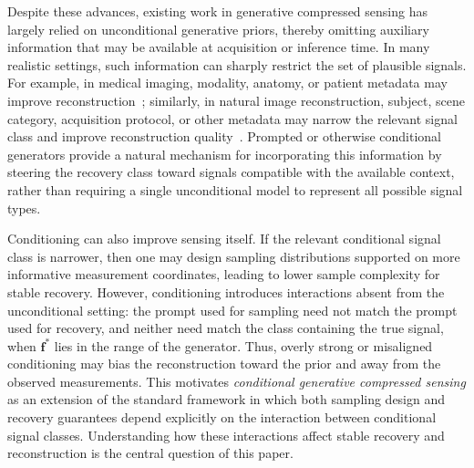 \documentclass{article}
\theoremstyle{plain}
\theoremstyle{definition}
\theoremstyle{remark}
\begin{document}
Despite these advances, existing work in generative compressed sensing has largely relied on unconditional generative priors, thereby omitting auxiliary information that may be available at acquisition or inference time. In many realistic settings, such information can sharply restrict the set of plausible signals. For example, in medical imaging, modality, anatomy, or patient metadata may improve reconstruction~\cite{chung2025contextmri}; similarly, in natural image reconstruction, subject, scene category, acquisition protocol, or other metadata may narrow the relevant signal class and improve reconstruction quality~\cite{chung2024prompttune, kim2025regularization}. Prompted or otherwise conditional generators provide a natural mechanism for incorporating this information by steering the recovery class toward signals compatible with the available context, rather than requiring a single unconditional model to represent all possible signal types.

Conditioning can also improve sensing itself. If the relevant conditional signal class is narrower, then one may design sampling distributions supported on more informative measurement coordinates, leading to lower sample complexity for stable recovery. However, conditioning introduces interactions absent from the unconditional setting: the prompt used for sampling need not match the prompt used for recovery, and neither need match the class containing the true signal, when $\mathbf f^*$ lies in the range of the generator. Thus, overly strong or misaligned conditioning may bias the reconstruction toward the prior and away from the observed measurements. This motivates \emph{conditional generative compressed sensing} as an extension of the standard framework in which both sampling design and recovery guarantees depend explicitly on the interaction between conditional signal classes. Understanding how these interactions affect stable recovery and reconstruction is the central question of this paper.
\end{document}
